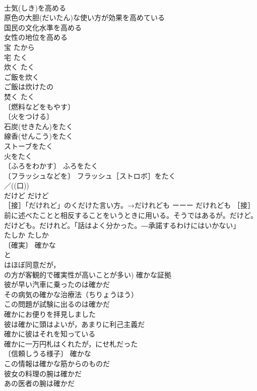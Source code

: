 \documentclass[8pt]{extreport}
\begin{document}
\begin{CJK}{UTF8}{min}
\\	士気(しき)を高める 
\\	原色の大胆(だいたん)な使い方が効果を高めている 
\\	国民の文化水準を高める 
\\	女性の地位を高める 
\\	宝	たから	
\\	宅	たく	
\\	炊く	たく	
\\	ご飯を炊く 
\\	ご飯は炊けたの 
\\	焚く	たく	
\\	〔燃料などをもやす〕
\\	〔火をつける〕
\\	石炭(せきたん)をたく 
\\	線香(せんこう)をたく 
\\	ストーブをたく 
\\	火をたく 
\\	〔ふろをわかす〕 ふろをたく 
\\	〔フラッシュなどを〕 フラッシュ［ストロボ］をたく 
\\	／((口)) 
\\	だけど	だけど	
\\	［接］「だけれど」のくだけた言い方。→だけれども ーーー だけれども ［接］前に述べたことと相反することをいうときに用いる。そうではあるが。だけど。だけども。だけれど。「話はよく分かった。―承諾するわけにはいかない」
\\	たしか	たしか	
\\	〔確実〕 確かな 
\\	と
\\	はほぼ同意だが，
\\	の方が客観的で確実性が高いことが多い) 確かな証拠 
\\	彼が早い汽車に乗ったのは確かだ 
\\	その病気の確かな治療法（ちりょうほう） 
\\	この問題が試験に出るのは確かだ 
\\	確かにお便りを拝見しました 
\\	彼は確かに頭はよいが，あまりに利己主義だ 
\\	確かに彼はそれを知っている 
\\	確かに一万円札はくれたが，にせ札だった 
\\	〔信頼しうる様子〕 確かな 
\\	この情報は確かな筋からのものだ 
\\	彼女の料理の腕は確かだ 
\\	あの医者の腕は確かだ 

\end{CJK}
\end{document}
